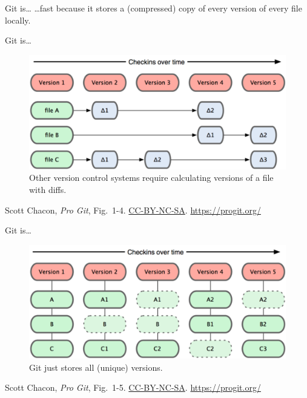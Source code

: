 \begin{frame}{Git is\ldots}
  \hangindent=30pt \Huge {
  \ldots fast because it stores a (compressed) copy of every version
  of every file locally.
  }
\end{frame}

\begin{frame}{Git is\ldots}
  \begin{figure}
    \includegraphics[scale=1.0]{18333fig0104-tn.png}
    \\ Other version control systems require calculating versions of a file with diffs.
  \end{figure}
  \footnotesize{Scott Chacon,
    \emph{Pro Git},
    Fig.~1-4.
    \href{https://creativecommons.org/licenses/by-nc-sa/3.0/legalcode}{CC-BY-NC-SA}.
    \href{https://progit.org/}{https://progit.org/}}

\end{frame}

\begin{frame}{Git is\ldots}
  \begin{figure}
    \includegraphics[scale=1.0]{18333fig0105-tn.png}
    \\ Git just stores all (unique) versions.
  \end{figure}
  \footnotesize{Scott Chacon,
    \emph{Pro Git},
    Fig.~1-5.
    \href{https://creativecommons.org/licenses/by-nc-sa/3.0/legalcode}{CC-BY-NC-SA}.
    \href{https://progit.org/}{https://progit.org/}}

\end{frame}

